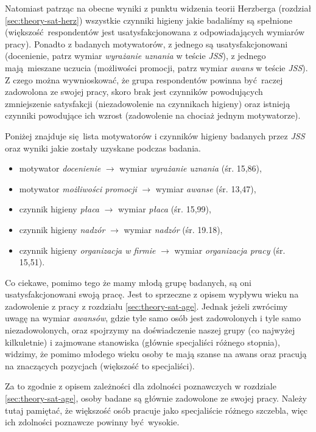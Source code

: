 Natomiast patrząc na obecne wyniki z punktu widzenia teorii Herzberga (rozdział \ref{sec:theory-sat-herz}) wszystkie czynniki higieny jakie badaliśmy są spełnione (większość respondentów jest usatysfakcjonowana z odpowiadających wymiarów pracy). Ponadto z badanych motywatorów, z jednego są usatysfakcjonowani (docenienie, patrz wymiar \textit{wyrażanie uznania} w teście \emph{JSS}), z jednego mają mieszane uczucia (możliwości promocji, patrz wymiar \textit{awans} w teście \emph{JSS}). Z czego można wywnioskować, że
grupa respondentów powinna być raczej zadowolona ze swojej pracy, skoro brak jest czynników powodujących zmniejszenie satysfakcji (niezadowolenie na czynnikach higieny) oraz istnieją czynniki powodujące ich wzrost (zadowolenie na chociaż jednym motywatorze). 

Poniżej znajduje się lista motywatorów i czynników higieny badanych przez \emph{JSS} oraz wyniki jakie zostały uzyskane podczas badania.

\begin{itemize}
  \item motywator \textit{docenienie} $\rightarrow$ wymiar \textit{wyrażanie uznania} (śr. 15,86),
  \item motywator \textit{możliwości promocji} $\rightarrow$ wymiar \textit{awanse} (śr. 13,47),
  \item czynnik higieny \textit{płaca} $\rightarrow$ wymiar \textit{płaca} (śr. 15,99),
  \item czynnik higieny \textit{nadzór} $\rightarrow$ wymiar \textit{nadzór} (śr. 19.18),
  \item czynnik higieny \textit{organizacja w firmie} $\rightarrow$ wymiar \textit{organizacja pracy} (śr. 15,51).
\end{itemize}

Co ciekawe, pomimo tego że mamy młodą grupę badanych, są oni usatysfakcjonowani swoją pracę. Jest to sprzeczne z opisem wypływu wieku na zadowolenie z pracy z rozdziału \ref{sec:theory-sat-age}. Jednak jeżeli zwrócimy uwagę na wymiar \textit{awansów}, gdzie tyle samo osób jest zadowolonych i tyle samo niezadowolonych, oraz spojrzymy na doświadczenie naszej grupy (co najwyżej kilkuletnie) i zajmowane stanowiska (głównie specjaliści różnego stopnia), widzimy, że pomimo młodego wieku
osoby te mają szanse na awans oraz pracują na znaczących pozycjach (większość to specjaliści).

Za to zgodnie z opisem zależności dla zdolności poznawczych w rozdziale \ref{sec:theory-sat-age}, osoby badane są głównie zadowolone ze swojej pracy. Należy tutaj pamiętać, że większość osób pracuje jako specjaliście różnego szczebla, więc ich zdolności poznawcze powinny być wysokie.


